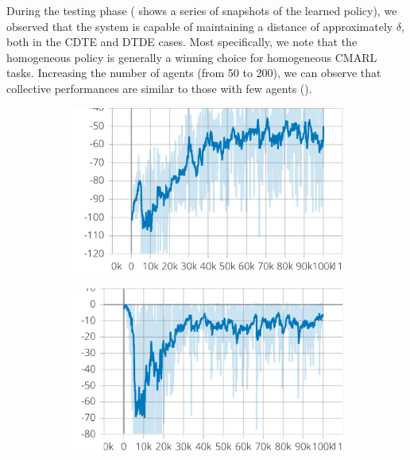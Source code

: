 During the testing phase 
 ( shows a series of snapshots of the learned policy), 
 we observed that the system is capable of maintaining a distance of approximately $\delta$, 
 both in the CDTE and DTDE cases. 
 Most specifically, 
 we note that the homogeneous policy is generally 
 a winning choice for homogeneous CMARL tasks. 
%
Increasing the number of agents (from 50 to 200), 
 we can observe that collective performances are similar to those with few agents ().
\begin{figure}[t]
    \centering
    \begin{subfigure}[b]{0.32\textwidth}
        \centering
        \includegraphics[width=\textwidth]{papers/coordination2023/imgs/reward-ctde.pdf}
    \end{subfigure}
    \hfill
    \begin{subfigure}[b]{0.32\textwidth}
        \centering
        \includegraphics[width=\textwidth]{papers/coordination2023/imgs/collision-ctde.pdf}

\end{subfigure}
\end{figure}
